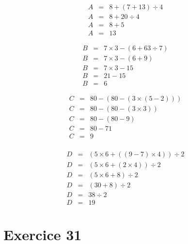 \documentclass[12pt,a4paper]{extarticle}
\begin{document}
\begin{multicols}{2}
	\begin{eqnarray*}
		A &=&  8 + (7 + 13) \div 4 \\
		A &=& 8 + 20 \div 4 \\
		A &=& 8 + 5 \\
		A &=& 13
	\end{eqnarray*}
	
	\begin{eqnarray*}
		B &=& 7 \times 3 - (6 + 63 \div 7) \\
		B &=& 7 \times 3 - (6 + 9)\\
		B &=& 7 \times 3 - 15 \\
		B &=& 21 - 15\\
		B &=& 6 
	\end{eqnarray*}
	
	\begin{eqnarray*}
		C &=& 80 - (80 - (3 \times (5 -2))) \\
		C &=& 80 - (80 - (3 \times 3)) \\
		C &=& 80 - (80 - 9) \\
		C &=& 80 - 71 \\
		C &=& 9 \\		
	\end{eqnarray*}
	
	\begin{eqnarray*}
		D &=&  (5 \times 6 + ((9 - 7) \times 4)) \div 2 \\
		D &=& (5 \times 6 + (2 \times 4)) \div 2 \\
		D &=& (5 \times 6 + 8) \div 2 \\
		D &=& (30 + 8) \div 2 \\
		D &=& 38 \div 2 \\
		D &=& 19
	\end{eqnarray*}
\end{multicols}


\section*{Exercice 31}
\vspace*{-1cm}
\end{document}
